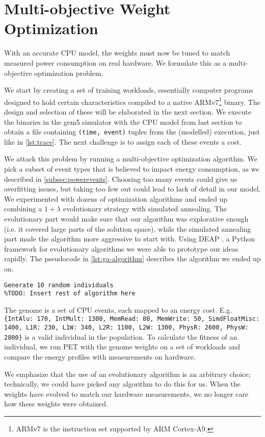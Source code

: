 \section{Multi-objective Weight Optimization}

With an accurate CPU model, the weights must now be tuned to match measured
power consumption on real hardware. We formulate this as a multi-objective
optimization problem.

We start by creating a set of training workloads, essentially computer programs
designed to hold certain characteristics compiled to a native
ARMv7\footnote{ARMv7 is the instruction set supported by ARM Cortex-A9.} binary.
The design and selection of these will be elaborated in the next section. We
execute the binaries in the gem5 simulator with the CPU model from last
section to obtain a file containing \texttt{(time, event)} tuples from the
(modelled) execution, just like in \autoref{lst:trace}. The next challenge is to
assign each of these events a cost.

We attack this problem by running a multi-objective optimization algorithm. We
pick a subset of event types that is believed to impact energy consumption, as
we described in \autoref{subsec:powerevents}. Choosing too many events could
give us overfitting issues, but taking too few out could lead to lack of detail
in our model. We experimented with dozens of optimization algorithms and ended
up combining a $1 + \lambda$ evolutionary strategy with simulated annealing. The
evolutionary part would make sure that our algorithm was explorative enough
(i.e. it covered large parts of the solution space), while the simulated
annealing part made the algorithm more aggressive to start with.  Using DEAP
\cite{DEAP_JMLR2012}, a Python framework for evolutionary algorithms we were
able to prototype our ideas rapidly. The pseudocode in
\autoref{lst:ga-algorithm} describes the algorithm we ended up on.

\begin{lstlisting}[caption={Algorithm used to evolve a set of event weights},label={lst:ga-algorithm}]
Generate 10 random individuals
%TODO: Insert rest of algorithm here
\end{lstlisting}

The genome is a set of CPU events, each mapped to an energy cost. E.g.
\texttt{\{IntAlu: 170, IntMult: 1300, MemRead: 80, MemWrite: 50, SimdFloatMisc:
1400, L1R: 230, L1W: 340, L2R: 1100, L2W: 1300, PhysR: 2600, PhysW: 2800\}} is a
valid individual in the population. To calculate the fitness of an individual,
we run PET with the genome weights on a set of workloads and compare the energy
profiles with measurements on hardware.

We emphasize that the use of an evolutionary algorithm is an arbitrary choice;
technically, we could have picked any algorithm to do this for us. When the
weights have evolved to match our hardware measurements, we no longer care how
these weights were obtained.
